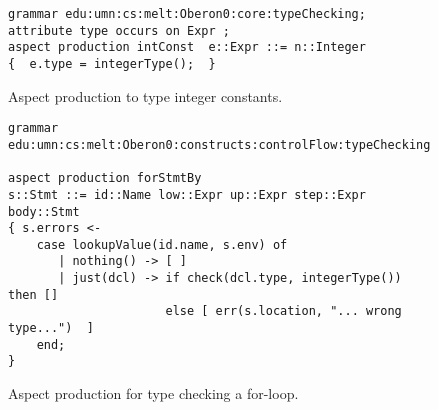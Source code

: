 \begin{figure}
{\small
\begin{verbatim}
grammar edu:umn:cs:melt:Oberon0:core:typeChecking;
attribute type occurs on Expr ;
aspect production intConst  e::Expr ::= n::Integer
{  e.type = integerType();  }
\end{verbatim}
}
\caption{Aspect production to type integer constants.}
\label{silver:fig:typing-number}
\end{figure}

\begin{figure}
\small
\begin{verbatim}
grammar edu:umn:cs:melt:Oberon0:constructs:controlFlow:typeChecking;

aspect production forStmtBy
s::Stmt ::= id::Name low::Expr up::Expr step::Expr body::Stmt
{ s.errors <- 
    case lookupValue(id.name, s.env) of
       | nothing() -> [ ] 
       | just(dcl) -> if check(dcl.type, integerType()) then []
                      else [ err(s.location, "... wrong type...")  ]
    end;
}
\end{verbatim}
\caption{Aspect production for type checking a for-loop.}
\label{silver:fig:typing-for}
\end{figure}

